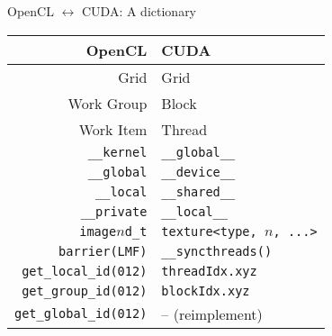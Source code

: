 \begin{frame}{OpenCL $\leftrightarrow$ CUDA: A dictionary}

  \begin{tabular}{r|l}
    \textbf{OpenCL} & \textbf{CUDA} \\
    \hline
    Grid & Grid \\
    Work Group& Block \\
    Work Item & Thread \\
    \texttt{\_\_kernel} & \texttt{\_\_global\_\_} \\
    \texttt{\_\_global} & \texttt{\_\_device\_\_} \\
    \texttt{\_\_local} & \texttt{\_\_shared\_\_} \\
    \texttt{\_\_private} & \texttt{\_\_local\_\_} \\
    \texttt{image$n$d\_t} & \texttt{texture\textless type, $n$, ...\textgreater} \\
    \texttt{barrier(LMF)} & \texttt{\_\_syncthreads()} \\
    \texttt{get\_local\_id(012)} & \texttt{threadIdx.xyz} \\
    \texttt{get\_group\_id(012)} & \texttt{blockIdx.xyz} \\
    \texttt{get\_global\_id(012)} & -- (reimplement) \\
  \end{tabular}
\end{frame}
